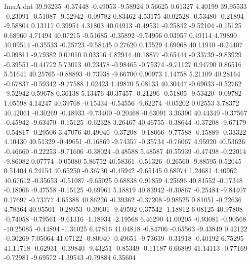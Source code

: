 \begin{filecontents}{ImuA.dat}
  39.93235   -0.37448   -0.49053   -9.58924    0.56625    0.61327    4.40199
  39.95533   -0.23091   -0.51087   -9.52942   -0.09782    0.83462    4.53175
  40.02528   -0.53480   -0.21894   -9.58804    0.13117    0.39954    4.31803
  40.04913   -0.49531   -0.25842   -9.52104   -0.15125    0.68960    4.71494
  40.07215   -0.51685   -0.35892   -9.74956    0.03957    0.49114    4.79890
  40.09514   -0.35533   -0.25723   -9.58445    0.27620    0.15529    4.69968
  40.11910   -0.24407   -0.09811   -9.79382    0.07010    0.03316    4.82944
  40.18877   -0.65444   -0.33739   -9.83929   -0.39551   -0.44772    5.73013
  40.23478   -0.98465   -0.75374   -9.71127    0.94790    0.86516    5.51641
  40.25765   -0.88893   -0.73938   -9.66700    0.90973    1.14758    5.21109
  40.28164   -0.67837   -0.59342   -9.77588    1.02423    1.49870    5.08133
  40.30447   -0.69033   -0.52762   -9.52942    0.59678    0.36138    5.13476
  40.37457   -0.21296   -0.51805   -9.53420   -0.09782    1.05598    4.14247
  40.39768   -0.15434   -0.54556   -9.62274   -0.05202    0.02553    3.78372
  40.42061   -0.30269   -0.48933   -9.73400   -0.20468   -0.63091    3.36390
  40.44349   -0.37567   -0.45942   -9.63470   -0.15125   -0.62328    3.26467
  40.46755   -0.38644   -0.37208   -9.67179   -0.54817   -0.29506    3.47076
  40.49046   -0.37208   -0.18066   -9.77588   -0.15889   -0.33322    4.10430
  40.51329   -0.49651   -0.16869   -9.74357   -0.35734   -0.76067    4.95920
  40.53626   -0.46660   -0.22253   -9.71606   -0.38024   -0.48588    5.48587
  40.55939   -0.47498   -0.22014   -9.86082    0.07774   -0.05080    5.86752
  40.58361   -0.51326   -0.26560   -9.88595    0.52045    0.51404    6.24154
  40.65250   -0.36730   -0.45942   -9.65145    0.68074    1.24681    4.40962
  40.67612   -0.35653   -0.51087   -9.65025    0.68838    0.91859    4.25696
  40.81552   -0.17348   -0.18066   -9.47558   -0.15125   -0.69961    5.18819
  40.83942   -0.30867   -0.25484   -9.84407    0.17697   -0.73777    4.65388
  40.86226   -0.39362   -0.37208   -9.98525    0.81051   -0.22636    4.78364
  40.95501   -0.28953   -0.39601   -9.49592    0.37542   -1.18812    6.08125
  40.97808   -0.74058   -0.79561   -9.61316   -1.18934   -2.19568    6.46290
  41.00205   -0.93081   -0.90568  -10.25085   -0.44894   -1.31025    6.47816
  41.04818   -0.84706   -0.65563   -9.43849    0.42122   -0.30269    7.05064
  41.07122   -0.80040   -0.49651   -9.73639   -0.31918   -0.40192    6.75295
  41.11718   -0.62931   -0.39840   -9.43251   -0.85349   -0.11187    6.66899
  41.14113   -0.77169   -0.72981   -9.69572   -1.39543   -0.79884    6.35604

\end{filecontents}
